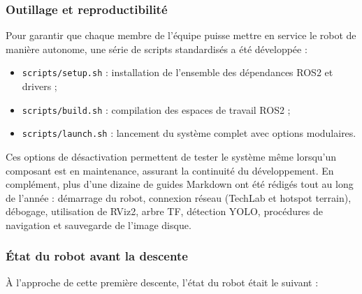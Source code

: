 \documentclass[12pt,a4paper]{article}
\begin{document}
\subsubsection{Outillage et reproductibilité}

Pour garantir que chaque membre de l'équipe puisse mettre en service le robot de manière autonome, une série de scripts standardisés a été développée :
\begin{itemize}
    \item \texttt{scripts/setup.sh} : installation de l'ensemble des dépendances ROS2 et drivers ;
    \item \texttt{scripts/build.sh} : compilation des espaces de travail ROS2 ;
    \item \texttt{scripts/launch.sh} : lancement du système complet avec options modulaires.
\end{itemize}

Ces options de désactivation permettent de tester le système même lorsqu'un composant est en maintenance, assurant la continuité du développement. En complément, plus d'une dizaine de guides Markdown ont été rédigés tout au long de l'année : démarrage du robot, connexion réseau (TechLab et hotspot terrain), débogage, utilisation de RViz2, arbre TF, détection YOLO, procédures de navigation et sauvegarde de l'image disque.

\subsubsection{État du robot avant la descente}

À l'approche de cette première descente, l'état du robot était le suivant :
\end{document}
